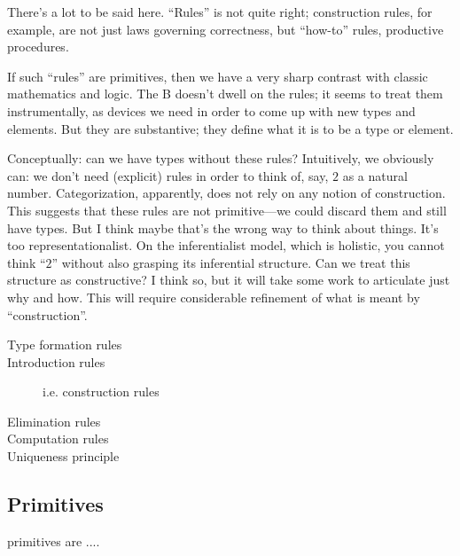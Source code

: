 \begin{ednote}
  There's a lot to be said here.  ``Rules'' is not quite right;
  construction rules, for example, are not just laws governing
  correctness, but ``how-to'' rules, productive procedures.

  If such ``rules'' are primitives, then we have a very sharp contrast
  with classic mathematics and logic.  The \HoTT{}B{} doesn't dwell on
  the rules; it seems to treat them instrumentally, as devices we need
  in order to come up with new types and elements.  But they are
  substantive; they define what it is to be a type or element.

  Conceptually: can we have types without these rules?  Intuitively,
  we obviously can: we don't need (explicit) rules in order to think
  of, say, $2$ as a natural number.  Categorization, apparently, does
  not rely on any notion of construction.  This suggests that these
  rules are not primitive---we could discard them and still have
  types.  But I think maybe that's the wrong way to think about
  things.  It's too representationalist.  On the inferentialist model,
  which is holistic, you cannot think ``$2$'' without also grasping
  its inferential structure.  Can we treat this structure as
  constructive?  I think so, but it will take some work to articulate
  just why and how.  This will require considerable refinement of what
  is meant by ``construction''.
\end{ednote}

\begin{description}
\item [Type formation rules]
\item [Introduction rules] i.e. construction rules
\item [Elimination rules]
\item [Computation rules]
\item [Uniqueness principle]
\end{description}

\subsection{\HoTT{} Primitives}
\label{subs:hottprimitives}

\HoTT{} primitives are ....

